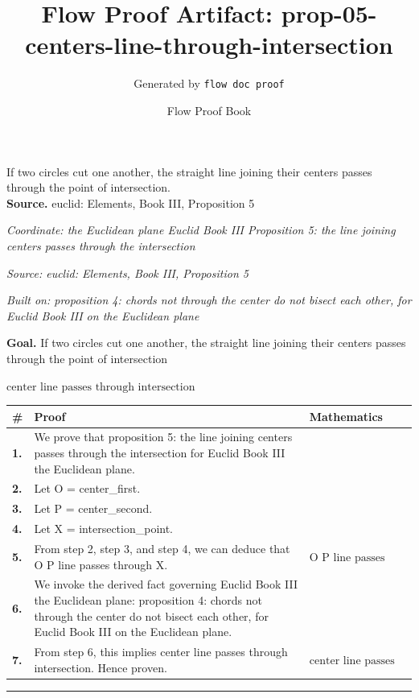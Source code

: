 \documentclass[11pt]{article}
\title{Flow Proof Artifact: prop-05-centers-line-through-intersection}
\author{Generated by \texttt{flow doc proof}}
\date{Flow Proof Book}
\theoremstyle{definition}
\begin{document}
\maketitle
If two circles cut one another, the straight line joining their centers passes through the point of intersection.\\[0.5em]
\textbf{Source.} euclid: Elements, Book III, Proposition 5\\[0.5em]
\bigskip
{}\par
\smallskip\noindent\textit{Coordinate: the Euclidean plane \cdot Euclid Book III \cdot Proposition 5: the line joining centers passes through the intersection}\par
\smallskip\noindent\textit{Source: euclid: Elements, Book III, Proposition 5}\par
\smallskip\noindent\textit{Built on: proposition 4: chords not through the center do not bisect each other, for Euclid Book III on the Euclidean plane}\par
\medskip
\noindent\textbf{Goal.} If two circles cut one another, the straight line joining their centers passes through the point of intersection\par
\noindent$\displaystyle \text{center line passes through intersection}$\par
\medskip
\noindent
\begin{tabular}{@{} >{\raggedright\arraybackslash}p{} >{\raggedright\arraybackslash}p{} >{\raggedleft\arraybackslash}p{} @{}}
\textbf{\#} & \textbf{Proof} & \textbf{Mathematics} \\
\midrule
\textbf{1.} & We prove that proposition 5: the line joining centers passes through the intersection for Euclid Book III the Euclidean plane. & \\[0.45em]
\textbf{2.} & Let O = center\_first. & \\[0.45em]
\textbf{3.} & Let P = center\_second. & \\[0.45em]
\textbf{4.} & Let X = intersection\_point. & \\[0.45em]
\textbf{5.} & From step 2, step 3, and step 4, we can deduce that O P line passes through X. & $\displaystyle \text{O P line passes through X}$ \\[0.45em]
\textbf{6.} & We invoke the derived fact governing Euclid Book III the Euclidean plane: proposition 4: chords not through the center do not bisect each other, for Euclid Book III on the Euclidean plane. & \\[0.45em]
\textbf{7.} & From step 6, this implies center line passes through intersection. Hence proven. & $\displaystyle \text{center line passes through intersection}$ \\[0.45em]
\bottomrule
\end{tabular}
\label{thm:Geometry-Euclid Book III-proposition_5_the_line_joining_centers_passes_through_the_intersection}
\par\medskip\hrule
\end{document}
